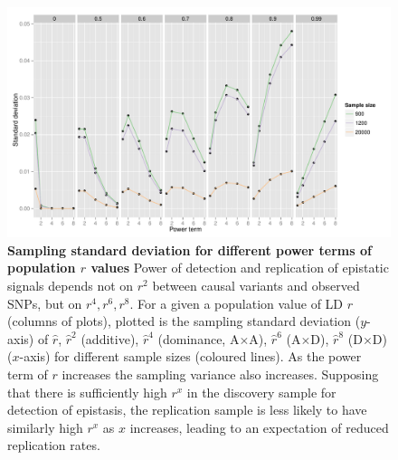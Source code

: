 \documentclass{article}
\begin{document}
\begin{figure}
	\centering
	\includegraphics[width=5in]{ld_sampling_sd}
	\caption{\textbf{Sampling standard deviation for different power terms of population $r$ values} Power of detection and replication of epistatic signals depends not on $r^2$ between causal variants and observed SNPs, but on $r^4, r^6, r^8$. For a given a population value of LD $r$ (columns of plots), plotted is the sampling standard deviation ($y$-axis) of $\hat{r}$, $\hat{r}^2$ (additive), $\hat{r}^4$ (dominance, A$\times$A), $\hat{r}^6$ (A$\times$D), $\hat{r}^8$ (D$\times$D) ($x$-axis) for different sample sizes (coloured lines). As the power term of $r$ increases the sampling variance also increases. Supposing that there is sufficiently high $r^x$ in the discovery sample for detection of epistasis, the replication sample is less likely to have similarly high $r^x$ as $x$ increases, leading to an expectation of reduced replication rates.}
	\label{fig:ld_sampling_sd}
\end{figure}
\clearpage
\end{document}
